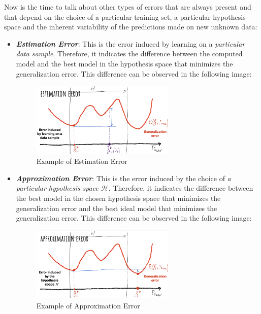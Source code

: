 Now is the time to talk about other types of errors that are always present
and that depend on the choice of a particular training set, a particular
hypothesis space and the inherent variability of the predictions made on
new unknown data:

\begin{itemize}
      \item \emph{\textbf{Estimation Error}}: This is the error induced by learning
            on a \emph{particular data sample}. Therefore, it indicates the difference
            between the computed model and the best model in the hypothesis space that
            minimizes the generalization error. This difference can be observed
            in the following image:

            \begin{figure}[h]
                  \centering
                  \includegraphics[width=0.65\textwidth]{../img/Estimation_error}
                  \caption{Example of Estimation Error}
            \end{figure}

      \item \emph{\textbf{Approximation Error}}: This is the error induced by the
            choice of \emph{a particular hypothesis space $\mathcal{H}$}. Therefore, it
            indicates the difference between the best model in the chosen hypothesis
            space that minimizes the generalization error and the best ideal model that
            minimizes the generalization error. This difference can be observed in the
            following image:

            \newpage

            \begin{figure}[h]
                  \centering
                  \includegraphics[width=0.65\textwidth]{../img/Approximation_error}
                  \caption{Example of Approximation Error}
            \end{figure}


\end{itemize}
